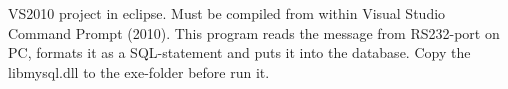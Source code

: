 V\+S2010 project in eclipse. Must be compiled from within Visual Studio Command Prompt (2010). This program reads the message from R\+S232-\/port on P\+C, formats it as a S\+Q\+L-\/statement and puts it into the database. Copy the libmysql.\+dll to the exe-\/folder before run it. 